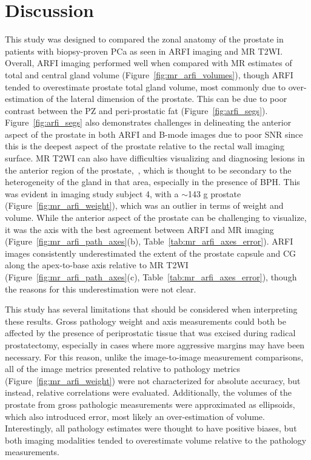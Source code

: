 \section{Discussion}\label{sect:discussion}
This study was designed to compared the zonal anatomy of the prostate in
patients with biopsy-proven PCa as seen in ARFI imaging and MR T2WI.  Overall,
ARFI imaging performed well when compared with MR estimates of total and
central gland volume (Figure~\ref{fig:mr_arfi_volumes}), though ARFI tended to
overestimate prostate total gland volume, most commonly due to over-estimation
of the lateral dimension of the prostate.  This can be due to poor contrast
between the PZ and peri-prostatic fat (Figure~\ref{fig:arfi_segs}).
Figure~\ref{fig:arfi_segs} also demonstrates challenges in delineating the
anterior aspect of the prostate in both ARFI and B-mode images due to poor SNR
since this is the deepest aspect of the prostate relative to the rectal wall
imaging surface. MR T2WI can also have difficulties visualizing and diagnosing
lesions in the anterior region of the prostate,~\cite{Gupta2013}, which is
thought to be secondary to the heterogeneity of the gland in that area,
especially in the presence of BPH.  This was evident in imaging study subject
4, with a $\sim$143 g prostate (Figure~\ref{fig:mr_arfi_weight}), which was an
outlier in terms of weight and volume.  While the anterior aspect of the
prostate can be challenging to visualize, it was the axis with the best
agreement between ARFI and MR imaging (Figure~\ref{fig:mr_arfi_path_axes}(b),
Table~\ref{tab:mr_arfi_axes_error}).  ARFI images consistently underestimated
the extent of the prostate capsule and CG along the apex-to-base axis relative
to MR T2WI (Figure~\ref{fig:mr_arfi_path_axes}(c),
Table~\ref{tab:mr_arfi_axes_error}), though the reasons for this
underestimation were not clear.

This study has several limitations that should be considered when interpreting
these results.  Gross pathology weight and axis measurements could both be
affected by the presence of periprostatic tissue that was excised during
radical prostatectomy, especially in cases where more aggressive margins may
have been necessary.  For this reason, unlike the image-to-image measurement
comparisons, all of the image metrics presented relative to pathology metrics
(Figure~\ref{fig:mr_arfi_weight}) were not characterized for absolute accuracy,
but instead, relative correlations were evaluated.  Additionally, the volumes
of the prostate from gross pathologic measurements were approximated as
ellipsoids, which also introduced error, most likely an over-estimation of
volume.  Interestingly, all pathology estimates were thought to have positive
biases, but both imaging modalities tended to overestimate volume relative to the
pathology measurements.

